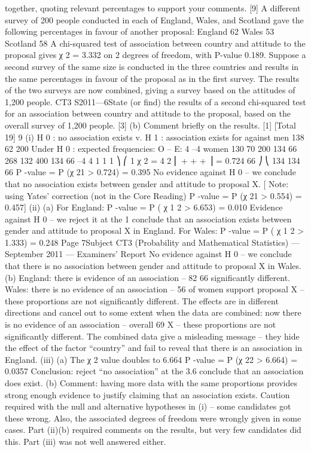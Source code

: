 together, quoting relevant percentages to support your comments.
[9]
A different survey of 200 people conducted in each of England, Wales, and
Scotland gave the following percentages in favour of another proposal:
England
62%
Wales
53%
Scotland
58%
A chi-squared test of association between country and attitude to the proposal
gives χ 2 = 3.332 on 2 degrees of freedom, with P-value 0.189.
Suppose a second survey of the same size is conducted in the three countries
and results in the same percentages in favour of the proposal as in the first
survey. The results of the two surveys are now combined, giving a survey
based on the attitudes of 1,200 people.
CT3 S2011—6State (or find) the results of a second chi-squared test for an association
between country and attitude to the proposal, based on the overall
survey of 1,200 people.
[3]
(b) Comment briefly on the results.
[1]
[Total 19]
9
(i)
H 0 : no association exists v. H 1 : association exists
for
against
men
138
62
200
Under H 0 : expected frequencies:
O – E:
4
–4
women
130
70
200
134
66
268
132
400
134
66
–4
4
1
1
1 ⎞
⎛ 1
χ 2 = 4 2 ⎜
+
+
+
⎟ = 0.724
66 ⎠
⎝ 134 134 66
P -value = P (χ 21 > 0.724) = 0.395
No evidence against H 0 – we conclude that no association exists between
gender and attitude to proposal X.
[ Note: using Yates’ correction (not in the Core Reading)
P -value = P (χ 21 > 0.554) = 0.457]
(ii)
(a)
For England:
P -value = P ( χ 1 2 > 6.653) = 0.010
Evidence against H 0 – we reject it at the 1%
conclude that an association exists between gender and attitude to
proposal X in England.
For Wales:
P -value = P ( χ 1 2 > 1.333) = 0.248
Page 7Subject CT3 (Probability and Mathematical Statistics) — September 2011 — Examiners’ Report
No evidence against H 0 – we conclude that there is no association
between gender and attitude to proposal X in Wales.
(b)
England: there is evidence of an association – 82%
66%
significantly different.
Wales: there is no evidence of an association – 56%
of women support proposal X – these proportions are not significantly
different.
The effects are in different directions and cancel out to some extent
when the data are combined: now there is no evidence of an
association – overall 69%
X – these proportions are not significantly different.
The combined data give a misleading message – they hide the effect of
the factor “country” and fail to reveal that there is an association in
England.
(iii)
(a)
The χ 2 value doubles to 6.664
P -value = P (χ 22 > 6.664) = 0.0357
Conclusion: reject “no association” at the 3.6%
conclude that an association does exist.
(b)
Comment: having more data with the same proportions provides strong
enough evidence to justify claiming that an association exists.
Caution required with the null and alternative hypotheses in (i) – some candidates got these
wrong. Also, the associated degrees of freedom were wrongly given in some cases. Part
(ii)(b) required comments on the results, but very few candidates did this. Part (iii) was not
well answered either.
